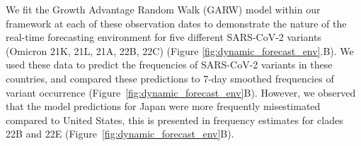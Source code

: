 \documentclass[11pt,oneside,letterpaper]{article}
\begin{document}
We fit the Growth Advantage Random Walk (GARW) model within our framework at each of these observation dates to demonstrate the nature of the real-time forecasting environment for five different SARS-CoV-2 variants (Omicron 21K, 21L, 21A, 22B, 22C) (Figure \ref{fig:dynamic_forecast_env}.B).
We used these data to predict the frequencies of SARS-CoV-2 variants in these countries, and compared these predictions to 7-day smoothed frequencies of variant occurrence (Figure~\ref{fig:dynamic_forecast_env}B).
However, we observed that the model predictions for Japan were more frequently misestimated compared to United States, this is presented in frequency estimates for clades 22B and 22E (Figure~\ref{fig:dynamic_forecast_env}B).
\end{document}
